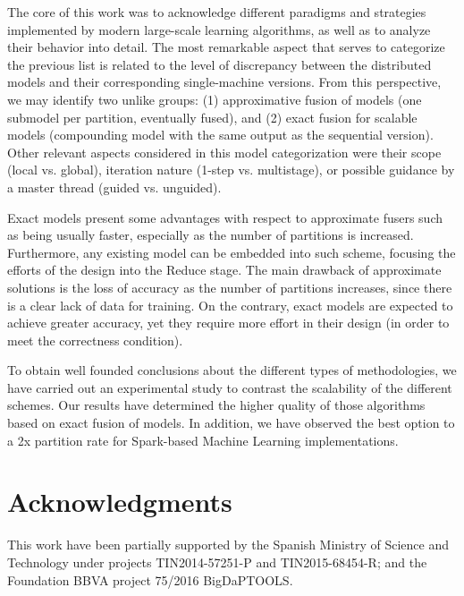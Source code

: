 \documentclass[3p,review]{elsarticle}
\begin{document}
The core of this work was to acknowledge different paradigms and strategies implemented by modern large-scale learning algorithms, as well as to analyze their behavior into detail. The most remarkable aspect that serves to categorize the previous list is related to the level of discrepancy between the distributed models and their corresponding single-machine versions. From this perspective, we may identify two unlike groups: (1) approximative fusion of models (one submodel per partition, eventually fused), and (2) exact fusion for scalable models (compounding model with the same output as the sequential version). Other relevant aspects considered in this model categorization were their scope (local vs. global), iteration nature (1-step vs. multistage), or possible guidance by a master thread (guided vs. unguided).

Exact models present some advantages with respect to approximate fusers such as being usually faster, especially as the number of partitions is increased. Furthermore, any existing model can be embedded into such scheme, focusing the efforts of the design into the Reduce stage. The main drawback of approximate solutions is the loss of accuracy as the number of partitions increases, since there is a clear lack of data for training. On the contrary, exact models are expected to achieve greater accuracy, yet they require more effort in their design (in order to meet the correctness condition).

To obtain well founded conclusions about the different types of methodologies, we have carried out an experimental study to contrast the scalability of the different schemes. Our results have determined the higher quality of those algorithms based on exact fusion of models. In addition, we have observed the best option to a 2x partition rate for Spark-based Machine Learning implementations. 

\section*{Acknowledgments}\label{sec:ack}

This work have been partially supported by the Spanish Ministry of Science and Technology under projects TIN2014-57251-P and TIN2015-68454-R; and the Foundation BBVA project 75/2016 BigDaPTOOLS.




\end{document}
